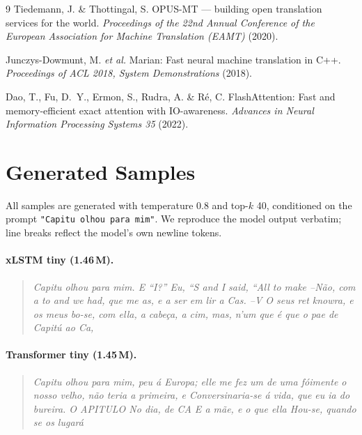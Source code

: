 \documentclass[11pt]{article}
\begin{document}
\begin{thebibliography}{9}
Tiedemann, J. \& Thottingal, S.
OPUS-MT --- building open translation services for the world.
\emph{Proceedings of the 22nd Annual Conference of the European
Association for Machine Translation (EAMT)} (2020).

Junczys-Dowmunt, M. \emph{et al.}
Marian: Fast neural machine translation in C++.
\emph{Proceedings of ACL 2018, System Demonstrations} (2018).

Dao, T., Fu, D.~Y., Ermon, S., Rudra, A. \& Ré, C.
FlashAttention: Fast and memory-efficient exact attention with
IO-awareness.
\emph{Advances in Neural Information Processing Systems 35} (2022).

\end{thebibliography}

\appendix
\section{Generated Samples}\label{app:samples}

All samples are generated with temperature 0.8 and top-$k$ 40, conditioned on
the prompt \texttt{"Capitu olhou para mim"}. We reproduce the model output
verbatim; line breaks reflect the model's own newline tokens.

\paragraph{xLSTM tiny (1.46\,M).}
\begin{quote}\small
\itshape
Capitu olhou para mim. E ``I?'' Eu, ``S and I said, ``All to make
--Não, com a to and we had, que me as, e a ser em lir a Cas. --V O seus
ret knowra, e os meus bo-se, com ella, a cabeça, a cim, mas, n'um que é
que o pae de Capitú ao Ca,
\end{quote}

\paragraph{Transformer tiny (1.45\,M).}
\begin{quote}\small
\itshape
Capitu olhou para mim, peu á Europa; elle me fez um de uma fóimente o
nosso velho, não teria a primeira, e Conversinaria-se á vida, que eu ia
do bureira. O APITULO No dia, de CA E a mãe, e o que ella Hou-se, quando
se os lugará
\end{quote}
\end{document}
